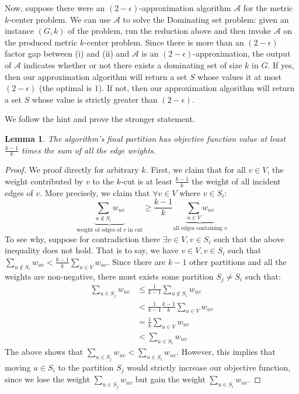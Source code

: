 \documentclass[12pt]{exam}
\newtheorem{lemma}[theorem]{Lemma}
\newcommand{\Q}[1]{\question{\large{\textbf{#1}}}}
\begin{document}
\begin{questions}
\begin{solution}
\begin{enumerate}[label=(\alph*)]
      Now, suppose there were an $(2-\epsilon)$-approximation algorithm $\mathcal{A}$ for the metric $k$-center problem. We can use $\mathcal{A}$ to solve the Dominating set problem: given an instance $(G,k)$ of the problem, run the reduction above and then invoke $\mathcal{A}$ on the produced metric $k$-center problem. Since there is more than an $(2 - \epsilon)$ factor gap between (i) and (ii) and $\mathcal{A}$ is an $(2 - \epsilon)$-approximation, the output of $\mathcal{A}$ indicates whether or not there exists a dominating set of size $k$ in $G$. If yes, then our approximation algorithm will return a set $S$ whose values it at most $(2-\epsilon)$ (the optimal is $1$). If not, then our approximation algorithm will return a set $S$ whose value is strictly greater than $(2 - \epsilon)$.
  \end{enumerate}
\end{solution}


\newpage
\Q{Problem 22}
\begin{solution}
    We follow the hint and prove the stronger statement.
    \begin{lemma}
      The algorithm's final partition has objective function value at least $\frac{k-1}{k}$ times the sum of all the edge weights.
    \end{lemma}
    \begin{proof}
      We proof directly for arbitrary $k$. First, we claim that for all $v \in V$, the weight contributed by $v$ to the $k$-cut is at least $\frac{k-1}{k}$ the weight of all incident edges of $v$. More precisely, we claim that $\forall v \in V$ where $v \in S_i$:
      \[
        \underbrace{\sum_{u \notin S_i} w_{uv}}_{\text{weight of edges of $v$ in cut}} \geq  \frac{k-1}{k} \underbrace{\sum_{u \in V} w_{uv}}_{\text{all edges containing $v$}}
      \]
      To see why, suppose for contradiction there $\exists v \in V, v \in S_i$ such that the above inequality does not hold. That is to say, we have $v \in V, v \in S_i$ such that $\sum_{u \notin S_i} w_{uv} < \frac{k-1}{k} \sum_{u \in V} w_{uv}$. Since there are $k-1$ other partitions and all the weights are non-negative, there must exists some partition $S_j \neq S_i$ such that:
      \begin{align*}
        \sum_{u \in S_j} w_{uv} &\leq \frac{1}{k-1} \sum_{u \notin S_i} w_{uv} \tag{Some partition must be at most the average weight} \\
        &<\frac{1}{k-1}\frac{k-1}{k} \sum_{u \in V} w_{uv} \tag{By our assumption} \\
        &= \frac{1}{k} \sum_{u \in V} w_{uv} \\
        &< \sum_{u \in S_i} w_{uv} \tag{By our assumption}
      \end{align*}
      The above shows that $\sum_{u \in S_j} w_{uv} < \sum_{u \in S_i} w_{uv}$. However, this implies that moving $u \in S_i$ to the partition $S_j$ would strictly increase our objective function, since we lose the weight $\sum_{u \in S_j} w_{uv}$ but gain the weight $\sum_{u \in S_i} w_{uv}$.


\end{proof}
\end{solution}
\end{questions}
\end{document}
